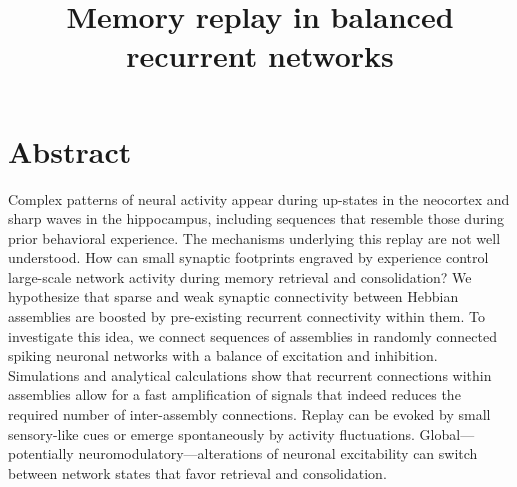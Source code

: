\documentclass[12pt, a4]{report}
\begin{document}
\title{Memory replay in balanced recurrent networks}

\maketitle
\newpage

\section*{Abstract}

Complex patterns of neural activity appear during up-states in the neocortex and sharp waves in the hippocampus, including sequences that resemble those during prior behavioral experience. The mechanisms underlying this replay are not well understood. How can small synaptic footprints engraved by experience control large-scale network activity during memory retrieval and consolidation? We hypothesize that sparse and weak synaptic connectivity between Hebbian assemblies are boosted by pre-existing recurrent connectivity within them. To investigate this idea, we connect sequences of assemblies in randomly connected spiking neuronal networks with a balance of excitation and inhibition. Simulations and analytical calculations show that recurrent connections within assemblies allow for a fast amplification of signals that indeed reduces the required number of inter-assembly connections. Replay can be evoked by small sensory-like cues or emerge spontaneously by activity fluctuations. Global---potentially neuromodulatory---alterations of neuronal excitability can switch between network states that favor retrieval and consolidation.

\newpage

\tableofcontents

%

%



\end{document}
